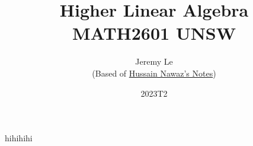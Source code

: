 \documentclass[12pt, letterpaper]{article}
\title{Higher Linear Algebra \\ MATH2601 UNSW}
\author{Jeremy Le \\ (Based of \href{https://github.com/imagine-hussain/math2601_notes/blob/main/main.pdf}{Hussain Nawaz's Notes})}
\date{2023T2}
\begin{document}
\maketitle
hihihihi

\tableofcontents
\newpage
    
    
\end{document}
